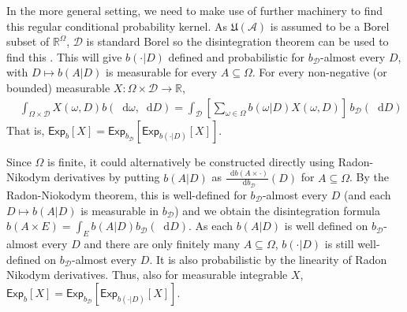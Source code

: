 \documentclass[a4paper]{article}
\newcommand\A{\mathcal{A}}
\newcommand\Exp{\mathsf{Exp}}
\newcommand\U{\mathfrak{U}} %
\newcommand{\Decs}{\mathcal{D}}
\newcommand\s{\mathsf{s}}
\newcommand{\n}{\mathsf{n}}
\renewcommand{\nu}{\n}
\renewcommand{\Re}{\mathbb{R}}
\renewcommand{\color}[1]{}
\newenvironment{colored}[1]{\leavevmode\color{#1}}{}
\newcommand*\diff{\mathop{}\!\mathrm{d}}
\newenvironment{CCM rewritten}
{\begingroup\color{blue}} %
{\endgroup}              %
\begin{document}
\begin{colored}{violet}
In the more general setting, we need to make use of further machinery to find this regular conditional probability kernel. 
As $\U(\A)$ is assumed to be a Borel subset of $\Re^\Omega$, $\Decs$ is standard Borel so the disintegration theorem can be used to find this \citep[Theorem 3.4]{kallenberg1997foundations}. 
This will give $b(\cdot|D)$ defined and probabilistic for $b_\Decs$-almost every $D$, with $D\mapsto b(A|D)$ is measurable for every $A\subseteq\Omega$. 
For every non-negative (or bounded) measurable $X:\Omega\times\Decs\to\Re$, \begin{align}
	&\int_{\Omega\times \Decs} X(\omega,D) b(\diff \omega, \diff D)=\int_\Decs \left[\sum_{\omega\in\Omega} b(\omega|D)X(\omega,D)\right]\,b_\Decs(\diff D)
\end{align}
That is, $\Exp_b[X]=\Exp_{b_\Decs}[\Exp_{b(\cdot|D)}[X]]$.

Since $\Omega$ is finite, it could alternatively be constructed directly using Radon-Nikodym derivatives by putting $b(A|D)$ as $\frac{\diff b(A\times\cdot)}{\diff b_\Decs}(D)$ for $A\subseteq\Omega$. 
By the Radon-Niokodym theorem, this is well-defined for $b_\Decs$-almost every $D$ (and each $D\mapsto b(A|D)$ is measurable in $b_\Decs$) and we obtain the disintegration formula $b(A\times E)=\int_E b(A|D) b_\Decs(\diff D)$.
As each $b(A|D)$ is well defined on $b_\Decs$-almost every $D$ and there are only finitely many $A\subseteq\Omega$, $b(\cdot|D)$ is still well-defined on $b_\Decs$-almost every $D$. It is also probabilistic by the linearity of Radon Nikodym derivatives. Thus, also for measurable integrable $X$, $\Exp_b[X]=\Exp_{b_\Decs}[\Exp_{b(\cdot|D)}[X]]$.





%
%
%
%
%
%
%
%
%
%
%



\end{colored}
\end{document}
